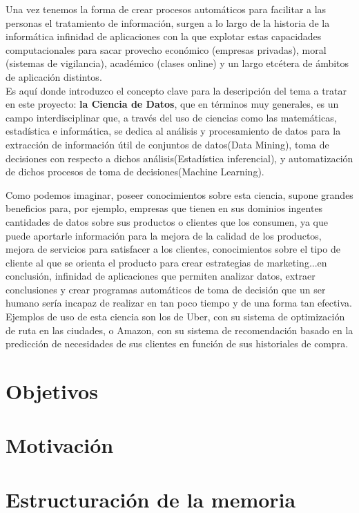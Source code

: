 Una vez tenemos la forma de crear procesos automáticos para facilitar a las personas el tratamiento de información, surgen a lo largo de la historia de la informática infinidad de aplicaciones con la que explotar estas capacidades computacionales para sacar provecho económico (empresas privadas), moral (sistemas de vigilancia), académico (clases online) y un largo etcétera de ámbitos de aplicación distintos.\\
Es aquí donde introduzco el concepto clave para la descripción del tema a tratar en este proyecto: \textbf{la Ciencia de Datos}, que en términos muy generales, es un campo interdisciplinar que, a través del uso de ciencias como las matemáticas, estadística e informática, se dedica al análisis y procesamiento de datos para la extracción de información útil de conjuntos de datos(Data Mining), toma de decisiones con respecto a dichos análisis(Estadística inferencial), y automatización de dichos procesos de toma de decisiones(Machine Learning).

Como podemos imaginar, poseer conocimientos sobre esta ciencia, supone grandes beneficios para, por ejemplo, empresas que tienen en sus dominios ingentes cantidades de datos sobre sus productos o clientes que los consumen, ya que puede aportarle información para la mejora de la calidad de los productos, mejora de servicios para satisfacer a los clientes, conocimientos sobre el tipo de cliente al que se orienta el producto para crear estrategias de marketing...en conclusión, infinidad de aplicaciones que permiten analizar datos, extraer conclusiones y crear programas automáticos de toma de decisión que un ser humano sería incapaz de realizar en tan poco tiempo y de una forma tan efectiva. Ejemplos de uso de esta ciencia son los de Uber, con su sistema de optimización de ruta en las ciudades, o Amazon, con su sistema de recomendación basado en la predicción de necesidades de sus clientes en función de sus historiales de compra.

\section{Objetivos}

\section{Motivación}

\section{Estructuración de la memoria}


























